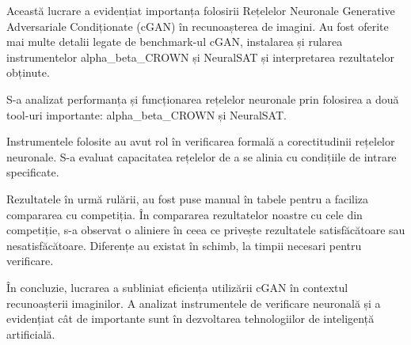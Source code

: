 Această lucrare a evidențiat importanța folosirii Rețelelor Neuronale Generative Adversariale Condiționate (cGAN) în recunoașterea de imagini. Au fost oferite mai multe detalii legate de benchmark-ul cGAN, instalarea și rularea instrumentelor      alpha\_beta\_CROWN și NeuralSAT și interpretarea rezultatelor obținute.

S-a analizat performanța și funcționarea rețelelor neuronale prin folosirea a două tool-uri importante: alpha\_beta\_CROWN și NeuralSAT. 

Instrumentele folosite au avut rol în verificarea formală a corectitudinii rețelelor neuronale. S-a evaluat capacitatea rețelelor de a se alinia cu condițiile de intrare specificate.

Rezultatele în urmă rulării, au fost puse manual în tabele pentru a faciliza compararea cu competiția. În compararea rezultatelor noastre cu cele din competiție, s-a observat o aliniere în ceea ce privește rezultatele satisfăcătoare sau nesatisfăcătoare. Diferențe au existat în schimb, la timpii necesari pentru verificare.

În concluzie, lucrarea a subliniat eficiența utilizării cGAN în contextul recunoașterii imaginilor. A analizat instrumentele de verificare neuronală și a evidențiat cât de importante sunt în dezvoltarea tehnologiilor de inteligență artificială.